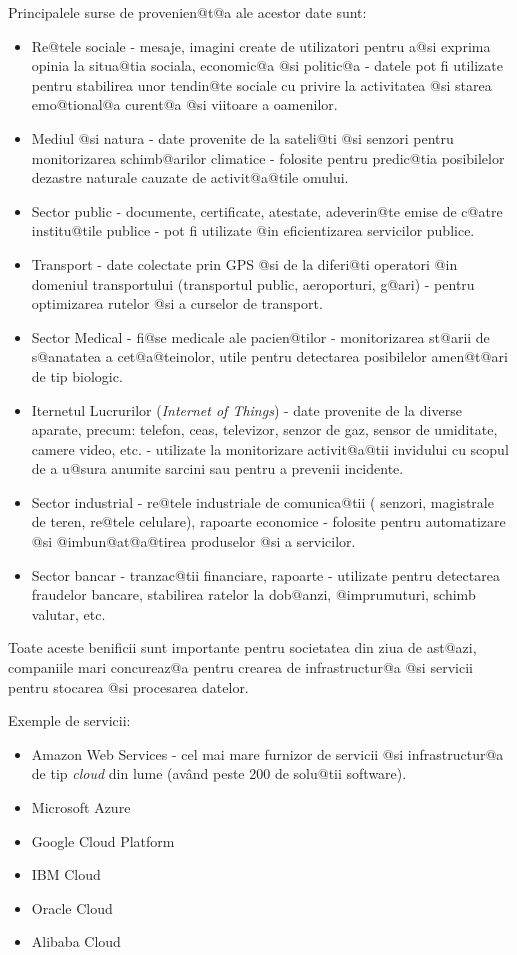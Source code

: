 Principalele surse de provenien@t@a ale acestor date sunt:
\begin{itemize}
	\item Re@tele sociale - mesaje, imagini create de utilizatori pentru a@si exprima opinia la situa@tia sociala, economic@a @si politic@a - datele pot fi utilizate pentru stabilirea unor tendin@te sociale cu privire la activitatea @si starea emo@tional@a curent@a @si viitoare a oamenilor.
	\item Mediul @si natura - date provenite de la sateli@ti @si senzori pentru monitorizarea schimb@arilor climatice - folosite pentru predic@tia posibilelor dezastre naturale cauzate de activit@a@tile omului.
	\item Sector public - documente, certificate, atestate, adeverin@te emise de c@atre institu@tile publice - pot fi utilizate @in eficientizarea servicilor publice.
	\item Transport - date colectate prin GPS @si de la diferi@ti operatori @in domeniul transportului (transportul public, aeroporturi, g@ari) - pentru optimizarea rutelor @si a curselor de transport.
	\item Sector Medical - fi@se medicale ale pacien@tilor - monitorizarea st@arii de s@anatatea a cet@a@teinolor, utile pentru detectarea posibilelor amen@t@ari de tip biologic.
	\item Iternetul Lucrurilor ({\sl Internet of Things}) - date provenite de la diverse aparate, precum: telefon, ceas, televizor, senzor de gaz, sensor de umiditate, camere video, etc. - utilizate la monitorizare activit@a@tii invidului cu scopul de a u@sura anumite sarcini sau pentru a prevenii incidente.
	\item Sector industrial - re@tele industriale de comunica@tii ( senzori, magistrale de teren, re@tele celulare), rapoarte economice - folosite pentru automatizare @si @imbun@at@a@tirea produselor @si a servicilor. 
	\item Sector bancar - tranzac@tii financiare, rapoarte - utilizate pentru detectarea fraudelor bancare, stabilirea ratelor la dob@anzi, @imprumuturi, schimb valutar, etc.
\end{itemize}

Toate aceste benificii sunt importante pentru societatea din ziua de ast@azi, companiile mari concureaz@a pentru crearea de infrastructur@a @si servicii pentru stocarea @si procesarea datelor.

Exemple de servicii:

\begin{itemize}
	\item Amazon Web Services - cel mai mare furnizor de servicii @si infrastructur@a de tip \textsl{cloud} din lume (av\^ and peste 200 de solu@tii software).
	\item Microsoft Azure 
	\item Google Cloud Platform
	\item IBM Cloud
	\item Oracle Cloud
	\item Alibaba Cloud
\end{itemize}

